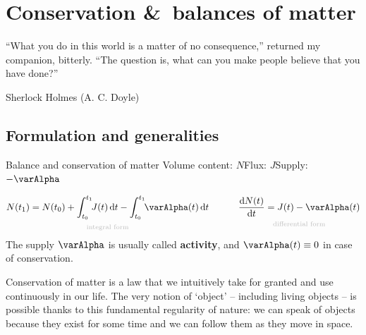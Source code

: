 \documentclass[a4paper,12pt,%
onecolumn,oneside,titlepage,%
british%
]{memoir}
\newcommand*{\amp}{\&}
\newcommand*{\di}{\mathrm{d}}%
\renewcommand*{\|}[1][]{\nonscript\:#1\vert\nonscript\:\mathopen{}}
\newcommand*{\yN}{N}
\newcommand*{\yJ}{J}
\newcommand*{\ya}{\varAlpha}
\newcommand*{\yti}{t_{0}}
\newcommand*{\ytf}{t_{1}}
\begin{document}
\printpagenotes*
\clearpage
\chapter{Conservation \amp\ balances of matter}
\label{cha:cons_matter}

\epigraph{\enquote{What you do in this world is a matter of no consequence,} returned my companion, bitterly. \enquote{The question is, what can you make people believe that you have done?\textellipsis}}{Sherlock Holmes (A. C. Doyle) \cites*{doyle1887}}

\section{Formulation and generalities}
\label{sec:cons_matter_formulation}

\begin{definition}{Balance and conservation of matter}
  Volume content: $\yN$\qquad Flux: $\yJ$\qquad Supply: $-\ya$

  \begin{equation}
    \label{eq:cons_matter}
      \underbracket[0pt]{\yN(\ytf) =\yN(\yti) + \int_{\yti}^{\ytf}\!\!\yJ(t)\,\di t  -\int_{\yti}^{\ytf}\!\!\ya(t)\,\di t}_{\mathclap{\text{\color{grey}integral form}}}
      \qquad\quad
      \underbracket[0pt]{\frac{\di\yN(t)}{\di t} = \yJ(t)  -\ya(t)}_{\mathclap{\text{\color{grey}differential form}}}
  \end{equation}
  The supply $\ya$ is usually called \textbf{activity}, and $\ya(t)\equiv 0$ in case of conservation.
\end{definition}

Conservation of matter is a law that we intuitively take for granted and use continuously in our life. The very notion of \enquote*{object} -- including living objects -- is possible thanks to this fundamental regularity of nature: we can speak of objects because they exist for some time and we can follow them as they move in space. %
\end{document}
